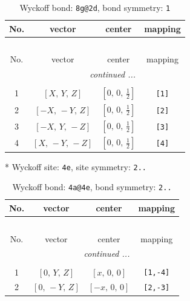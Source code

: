 \documentclass[fleqn,8pt]{jsarticle}
\begin{document}
\begin{longtable}{cccc}
\caption{Wyckoff bond: {\tt 8g@2d}, bond symmetry: {\tt 1}}
 \\
 \hline \hline
No. & vector & center & mapping \\ \hline \endfirsthead

\multicolumn{3}{l}{\tablename\ \thetable{}} \\
 \hline \hline
No. & vector & center & mapping \\ \hline \endhead

 \hline \hline
\multicolumn{3}{r}{\footnotesize\it continued ...} \\ \endfoot

 \hline \hline
\multicolumn{3}{r}{} \\ \endlastfoot

1 & $\left[ X,\, Y,\, Z \right]$ & $\left[ 0,\, 0,\, \frac{1}{2} \right]$ & {\tt [1]} \\ \hline
2 & $\left[ - X,\, - Y,\, Z \right]$ & $\left[ 0,\, 0,\, \frac{1}{2} \right]$ & {\tt [2]} \\ \hline
3 & $\left[ - X,\, Y,\, - Z \right]$ & $\left[ 0,\, 0,\, \frac{1}{2} \right]$ & {\tt [3]} \\ \hline
4 & $\left[ X,\, - Y,\, - Z \right]$ & $\left[ 0,\, 0,\, \frac{1}{2} \right]$ & {\tt [4]} \\
\end{longtable}
* Wyckoff site: {\tt 4e}, site symmetry: {\tt 2..}
\renewcommand{\arraystretch}{1.2}
\begin{longtable}{cccc}
\caption{Wyckoff bond: {\tt 4a@4e}, bond symmetry: {\tt 2..}}
 \\
 \hline \hline
No. & vector & center & mapping \\ \hline \endfirsthead

\multicolumn{3}{l}{\tablename\ \thetable{}} \\
 \hline \hline
No. & vector & center & mapping \\ \hline \endhead

 \hline \hline
\multicolumn{3}{r}{\footnotesize\it continued ...} \\ \endfoot

 \hline \hline
\multicolumn{3}{r}{} \\ \endlastfoot

1 & $\left[ 0,\, Y,\, Z \right]$ & $\left[ x,\, 0,\, 0 \right]$ & {\tt [1,-4]} \\ \hline
2 & $\left[ 0,\, - Y,\, Z \right]$ & $\left[ - x,\, 0,\, 0 \right]$ & {\tt [2,-3]} \\
\end{longtable}
\end{document}
